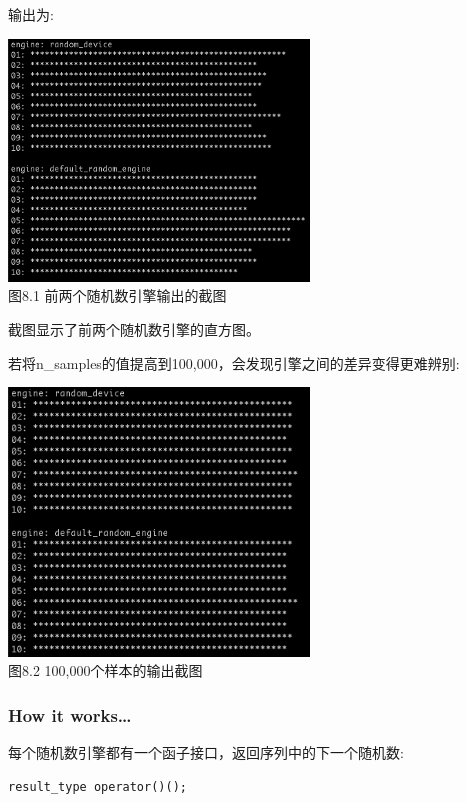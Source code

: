 \begin{itemize}
输出为:

\begin{center}
\includegraphics[width=0.6\textwidth]{content/chapter8/images/1.png}\\
图8.1 前两个随机数引擎输出的截图
\end{center}

截图显示了前两个随机数引擎的直方图。

若将n\_samples的值提高到100,000，会发现引擎之间的差异变得更难辨别:

\begin{center}
\includegraphics[width=0.6\textwidth]{content/chapter8/images/2.png}\\
图8.2  100,000个样本的输出截图
\end{center}

\end{itemize}

\subsubsection{How it works…}

每个随机数引擎都有一个函子接口，返回序列中的下一个随机数:

\begin{lstlisting}[style=styleCXX]
result_type operator()();
\end{lstlisting}

